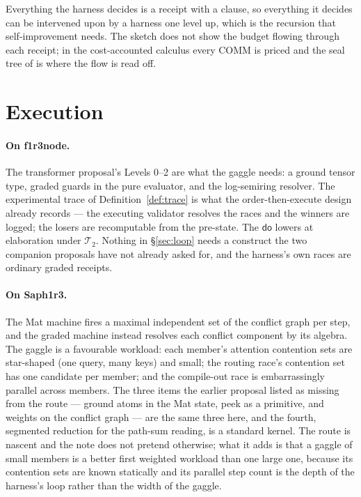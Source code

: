 \documentclass[11pt]{article}
\theoremstyle{plain}
\theoremstyle{definition}
\theoremstyle{remark}
\newcommand{\dok}{\textsf{do}}
\begin{document}
Everything the harness decides is a receipt with a clause, so everything it
decides can be intervened upon by a harness one level up, which is the
recursion that self-improvement needs. The sketch does not show the budget
flowing through each receipt; in the cost-accounted calculus every COMM is
priced and the seal tree of \cite{CostMonad} is where the flow is read off.

\section{Execution}\label{sec:execution}

\paragraph{On f1r3node.} The transformer proposal's Levels 0--2 are what the
gaggle needs: a ground tensor type, graded guards in the pure evaluator, and the
log-semiring resolver. The experimental trace of Definition~\ref{def:trace} is
what the order-then-execute design already records --- the executing validator
resolves the races and the winners are logged; the losers are recomputable from
the pre-state. The $\dok$ lowers at elaboration under $\mathcal{T}_2$. Nothing
in \S\ref{sec:loop} needs a construct the two companion proposals have not
already asked for, and the harness's own races are ordinary graded receipts.

\paragraph{On Saph1r3.} The Mat machine fires a maximal independent set of the
conflict graph per step, and the graded machine instead resolves each conflict
component by its algebra. The gaggle is a favourable workload: each member's
attention contention sets are star-shaped (one query, many keys) and small; the
routing race's contention set has one candidate per member; and the compile-out
race is embarrassingly parallel across members. The three items the earlier
proposal listed as missing from the route --- ground atoms in the Mat state,
peek as a primitive, and weights on the conflict graph --- are the same three
here, and the fourth, segmented reduction for the path-sum reading, is a
standard kernel. The route is nascent and the note does not pretend otherwise;
what it adds is that a gaggle of small members is a better first weighted
workload than one large one, because its contention sets are known statically
and its parallel step count is the depth of the harness's loop rather than the
width of the gaggle.
\end{document}
